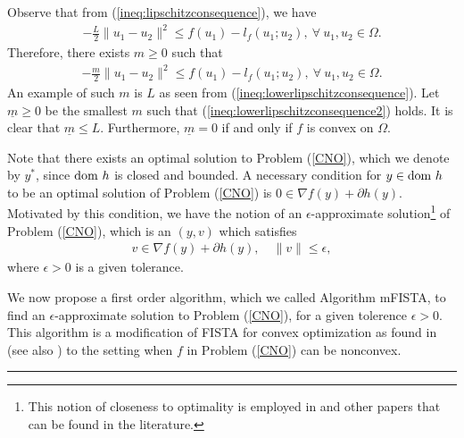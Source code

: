 \documentclass[11pt]{article}
\begin{document}
\noindent Observe that from (\ref{ineq:lipschitzconsequence}), we have
\begin{eqnarray}\label{ineq:lowerlipschitzconsequence}
-\frac{L}{2} \| u_1 - u_2 \|^2 \leq f(u_1) - l_f(u_1; u_2), \ \forall\ u_1, u_2 \in \Omega.
\end{eqnarray}
Therefore, there exists $m \geq 0$ such that
\begin{eqnarray}\label{ineq:lowerlipschitzconsequence2}
-\frac{m}{2} \| u_1 - u_2 \|^2 \leq f(u_1) - l_f(u_1; u_2), \ \forall\ u_1, u_2 \in \Omega.
\end{eqnarray}
An example of such $m$ is $L$ as seen from (\ref{ineq:lowerlipschitzconsequence}).  Let $\underline{m} \geq 0$ be the smallest $m$ such that (\ref{ineq:lowerlipschitzconsequence2}) holds.  It is clear that $\underline{m} \leq L$.  Furthermore,  $\underline{m} = 0$ if and only if $f$ is convex on $\Omega$.



\vspace{10pt}

\noindent Note that there exists an optimal solution to Problem (\ref{CNO}), which we denote by $y^\ast$, since ${\rm{dom}}\ h$ is closed and bounded.   A necessary condition for $y \in {\rm{dom}} \ h$ to be an optimal solution of Problem (\ref{CNO}) is $0 \in \nabla f({y}) + \partial h(y)$.  Motivated by this condition, we have the notion of an $\epsilon$-approximate solution\footnote{This notion of closeness to optimality is employed in \cite{Kong,Kong2,Liang3} and other papers that can be found in the literature.} of Problem (\ref{CNO}), which is an $(y, v)$ which satisfies
\begin{eqnarray}\label{approximatesolution}
v \in \nabla f(y) + \partial h(y), \quad \| v \| \leq \epsilon,
\end{eqnarray}
where ${\epsilon} > 0$ is a given tolerance.  

\vspace{10pt}

\noindent We now propose a first order algorithm, which we called Algorithm mFISTA, to find an ${\epsilon}$-approximate solution to Problem (\ref{CNO}), for a given tolerence ${\epsilon} > 0$.   This algorithm is a modification of FISTA for convex optimization as found in \cite{Beck} (see also \cite{Nesterov4}) to the setting when $f$ in Problem (\ref{CNO}) can be nonconvex.


\noindent\rule[0.5ex]{1\columnwidth}{1pt}
\end{document}

